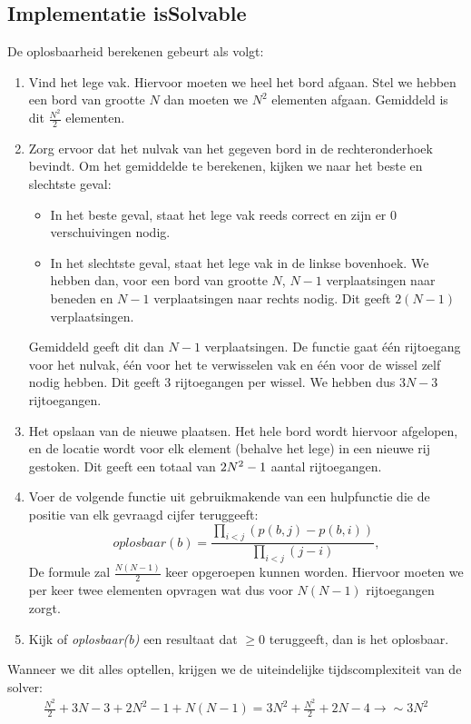 \documentclass[a4paper]{article}
\numberwithin{equation}{section}
\begin{document}
        \pagebreak

        \subsection{Implementatie isSolvable}
        De oplosbaarheid berekenen gebeurt als volgt:
        \begin{enumerate}
            \item Vind het lege vak. Hiervoor moeten we heel het bord afgaan. Stel we hebben een bord van grootte $N$ dan moeten we $N^2$ elementen afgaan.
            Gemiddeld is dit $\frac{N^2}{2}$ elementen.
            \item Zorg ervoor dat het nulvak van het gegeven bord in de rechteronderhoek bevindt. Om het gemiddelde te berekenen, kijken we naar het beste en slechtste geval:
            \begin{itemize}
                \item In het beste geval, staat het lege vak reeds correct en zijn er $0$ verschuivingen nodig.
                \item In het slechtste geval, staat het lege vak in de linkse bovenhoek. We hebben dan, voor een bord van grootte $N$, $N - 1$ verplaatsingen naar beneden en $N - 1$ verplaatsingen naar rechts nodig. Dit geeft $2(N-1)$ verplaatsingen.
            \end{itemize}
            Gemiddeld geeft dit dan $N - 1$ verplaatsingen. De functie gaat \'e\'en rijtoegang voor het nulvak, \'e\'en voor het te verwisselen vak en \'e\'en voor de wissel zelf nodig hebben. Dit geeft $3$ rijtoegangen per wissel. We hebben dus $3N-3$ rijtoegangen.
            \item Het opslaan van de nieuwe plaatsen. Het hele bord wordt hiervoor afgelopen, en de locatie wordt voor elk element (behalve het lege) in een nieuwe rij gestoken.  Dit geeft een totaal van $2N^2 \-- 1$ aantal rijtoegangen.
            \item Voer de volgende functie uit gebruikmakende van een hulpfunctie die de positie van elk gevraagd cijfer teruggeeft:
            \begin{equation}
                oplosbaar(b) = \frac{\prod_{i<j} (p(b, j)-p(b, i))}{\prod_{i<j}(j-i)},
            \end{equation}
            De formule zal $\frac{N(N-1)}{2}$ keer opgeroepen kunnen worden. Hiervoor moeten we per keer twee elementen opvragen wat dus voor $N(N-1)$ rijtoegangen zorgt.  
            \item Kijk of \textit{oplosbaar(b)} een resultaat dat $\geq 0$ teruggeeft, dan is het oplosbaar.
        \end{enumerate}
        Wanneer we dit alles optellen, krijgen we de uiteindelijke tijdscomplexiteit van de solver:
        \begin{align*}
            \frac{N^2}{2} + 3N -3 + 2N^2 - 1 + N(N-1) = 3N^2 + \frac{N^2}{2} +2N -4 \rightarrow \sim 3N^2
        \end{align*}
        
\end{document}
